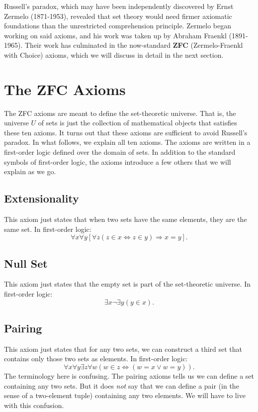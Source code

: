 \documentclass[11pt]{article}
\theoremstyle{definition}
\theoremstyle{remark}
\begin{document}
Russell's paradox, which may have been independently discovered by Ernst Zermelo (1871-1953), revealed that set theory would need firmer axiomatic foundations than the unrestricted comprehension principle. Zermelo began working on said axioms, and his work was taken up by Abraham Fraenkl (1891-1965). Their work has culminated in the now-standard \textbf{ZFC} (Zermelo-Fraenkl with Choice) axioms, which we will discuss in detail in the next section.\par 


\section{The ZFC Axioms}
The ZFC axioms are meant to define the set-theoretic universe. That is, the universe $U$ of sets is just the collection of mathematical objects that satisfies these ten axioms. It turns out that these axioms are sufficient to avoid Russell's paradox. In what follows, we explain all ten axioms. The axioms are written in a first-order logic defined over the domain of sets. In addition to the standard symbols of first-order logic, the axioms introduce a few others that we will explain as we go.

\subsection{Extensionality}
This axiom just states that when two sets have the same elements, they are the same set. In first-order logic: 
$$\forall x\forall y \left[\forall z (z\in x \iff z\in y)\Rightarrow x=y\right].$$

\subsection{Null Set}
This axiom just states that the empty set is part of the set-theoretic universe. In first-order logic:
$$\exists x \neg\exists y (y\in x).$$

\subsection{Pairing}
This axiom just states that for any two sets, we can construct a third set that contains only those two sets as elements. In first-order logic:
$$\forall x \forall y \exists z \forall w \left(w\in z \iff (w=x \vee w=y)\right).$$
The terminology here is confusing. The pairing axioms tells us we can define a set containing any two sets. But it does \textit{not} say that we can define a pair (in the sense of a two-element tuple) containing any two elements. We will have to live with this confusion.
\end{document}
